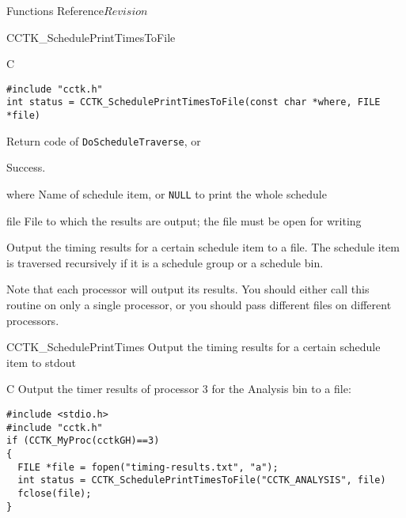 \begin{cactuspart}{ Functions Reference}{}{$Revision$}
\begin{FunctionDescription}{CCTK\_SchedulePrintTimesToFile}
  \begin{SynopsisSection}
    \begin{Synopsis}{C}
\begin{verbatim}
#include "cctk.h"
int status = CCTK_SchedulePrintTimesToFile(const char *where, FILE *file)
\end{verbatim}
    \end{Synopsis}
  \end{SynopsisSection}
  
  \begin{ResultSection}
    \begin{ResultNote}
      Return code of \texttt{DoScheduleTraverse}, or
    \end{ResultNote}
    \begin{Result}{0}
      Success.
    \end{Result}
  \end{ResultSection}
  
  \begin{ParameterSection}
    \begin{Parameter}{where}
      Name of schedule item, or \texttt{NULL} to print the whole
      schedule
    \end{Parameter}
    \begin{Parameter}{file}
      File to which the results are output; the file must be open for
      writing
    \end{Parameter}
  \end{ParameterSection}
  
  \begin{Discussion}
    Output the timing results for a certain schedule item to a file.
    The schedule item is traversed recursively if it is a schedule
    group or a schedule bin.
    
    Note that each processor will output its results.  You should
    either call this routine on only a single processor, or you should
    pass different files on different processors.
  \end{Discussion}
  
  \begin{SeeAlsoSection}
    \begin{SeeAlso}{CCTK\_SchedulePrintTimes}
      Output the timing results for a certain schedule item to stdout
    \end{SeeAlso}
  \end{SeeAlsoSection}

  \begin{ExampleSection}
    \begin{Example}{C}
      Output the timer results of processor 3 for the Analysis bin to
      a file:
\begin{verbatim}
#include <stdio.h>
#include "cctk.h"
if (CCTK_MyProc(cctkGH)==3)
{
  FILE *file = fopen("timing-results.txt", "a");
  int status = CCTK_SchedulePrintTimesToFile("CCTK_ANALYSIS", file)
  fclose(file);
}
\end{verbatim}
\end{Example}
  \end{ExampleSection}
  

\end{FunctionDescription}
\end{cactuspart}
